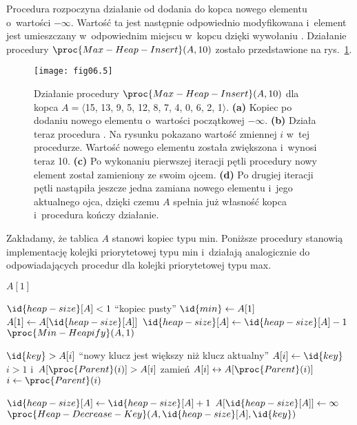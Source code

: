 \exercise %
Procedura  rozpoczyna działanie od dodania do kopca nowego elementu o~wartości $-\infty$. Wartość ta jest następnie odpowiednio modyfikowana i~element jest umieszczany w~odpowiednim miejscu w~kopcu dzięki wywołaniu . Działanie procedury $\proc{Max-Heap-Insert}(A,10)$ zostało przedstawione na rys.~\ref{fig:6.5-2}.
\begin{figure}[ht]
	\begin{center}
		\texttt{[image: fig06.5]}
	\end{center}
	\caption{Działanie procedury $\proc{Max-Heap-Insert}(A,10)$ dla kopca $A=\langle$15, 13, 9, 5, 12, 8, 7, 4, 0, 6, 2, 1$\rangle$. {\sffamily\bfseries(a)} Kopiec po dodaniu nowego elementu o~wartości początkowej $-\infty$. {\sffamily\bfseries(b)} Działa teraz procedura . Na rysunku pokazano wartość zmiennej $i$ w~tej procedurze. Wartość nowego elementu została zwiększona i~wynosi teraz 10. {\sffamily\bfseries(c)} Po wykonaniu pierwszej iteracji pętli  procedury  nowy element został zamieniony ze swoim ojcem. {\sffamily\bfseries(d)} Po drugiej iteracji pętli nastąpiła jeszcze jedna zamiana nowego elementu i~jego aktualnego ojca, dzięki czemu $A$ spełnia już własność kopca i~procedura kończy działanie.} \label{fig:6.5-2}
\end{figure}

\exercise %
Zakładamy, że tablica $A$ stanowi kopiec typu min. Poniższe procedury stanowią implementację kolejki priorytetowej typu min i~działają analogicznie do odpowiadających procedur dla kolejki priorytetowej typu max.
\begin{codebox}
\li	\Return $A[1]$
\end{codebox}
\begin{codebox}
\li	\If $\id{heap-size}[A]<1$
\li		\Then \Error ``kopiec pusty''
		\End
\li	$\id{min}\gets A[1]$
\li	$A[1]\gets A[\id{heap-size}[A]]$
\li	$\id{heap-size}[A]\gets\id{heap-size}[A]-1$
\li	$\proc{Min-Heapify}(A,1)$
\li	\Return {}
\end{codebox}
\begin{codebox}
\li	\If $\id{key}>A[i]$
\li		\Then \Error ``nowy klucz jest większy niż klucz aktualny''
		\End
\li	$A[i]\gets\id{key}$
\li	\While $i>1$ i~$A[\proc{Parent}(i)]>A[i]$
\li		\Do
			zamień $A[i]\leftrightarrow A[\proc{Parent}(i)]$
\li			$i\gets\proc{Parent}(i)$
		\End
\end{codebox}
\begin{codebox}
\li	$\id{heap-size}[A]\gets\id{heap-size}[A]+1$
\li	$A[\id{heap-size}[A]]\gets\infty$
\li	$\proc{Heap-Decrease-Key}(A,\id{heap-size}[A],\id{key})$
\end{codebox}

